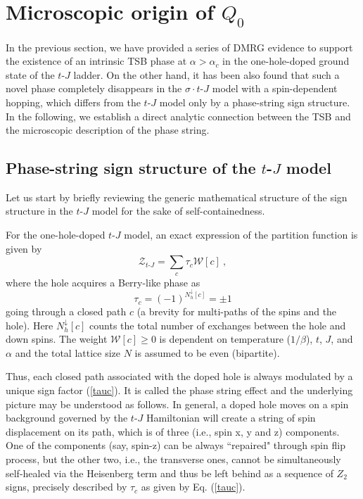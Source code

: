 \documentclass[aps,prb,twocolumn,notitlepage,superscriptaddress,showpacs]{revtex4-1}
\begin{document}
\section{Microscopic origin of $Q_0$}

In the previous section, we have provided a series of DMRG evidence to support the existence of an intrinsic TSB phase at $\alpha>\alpha_c$ in the one-hole-doped ground state of the $t$-$J$ ladder. On the other hand, it has been also found \cite{ZZ2013} that such a novel phase completely disappears in the $\sigma\cdot$$t$-$J$ model with a spin-dependent hopping, which differs from the $t$-$J$ model only by a phase-string sign structure. In the following, we establish a direct analytic connection between the TSB and the microscopic description of the phase string.



\subsection{Phase-string sign structure of the  $t$-$J$ model}

Let us start by briefly reviewing the generic mathematical structure of the sign structure in the $t$-$J$ model for the sake of self-containedness.

For the one-hole-doped $t$-$J$ model, an exact expression of the partition function is given by \cite{Wu2008sign}
\begin{equation}\label{Zc}
\mathcal{Z}_{t\text{-}J}=\sum_{c}{\tau }_{c}\mathcal{W}[c]~,
\end{equation}
where the hole acquires a Berry-like phase \cite{Sheng1996} as
\begin{equation}\label{tauc}
\tau _c  = \left( { - 1} \right)^{N_h^ \downarrow  [c]}=\pm 1
\end{equation}
going through a closed path $c$ (a brevity for multi-paths of the spins and the hole). Here $N_{h}^{\downarrow }[c]$ counts the total number of exchanges between the hole and down spins. The weight $\mathcal{W}[c]\ge 0$ is dependent on temperature ($1/\beta$), $t$, $J$, and $\alpha$ \cite{Wu2008sign} and the total lattice size $N$ is assumed to be even (bipartite).

Thus, each closed path associated with the doped hole is always modulated by a unique sign factor (\ref{tauc}). It is called\cite{Sheng1996} the phase string effect and the underlying picture may be understood as follows. In general, a doped hole moves on a spin background governed by the $t$-$J$ Hamiltonian will create a string of spin displacement on its path, which is of three (i.e., spin x, y and z) components. One of the components (say, spin-z) can be always ``repaired" through spin flip process, but the other two, i.e., the transverse ones, cannot be simultaneously self-healed via the Heisenberg term and thus be left behind as a sequence of $Z_2$ signs, precisely described by $\tau_c$ as given by Eq. (\ref{tauc}).
\end{document}

